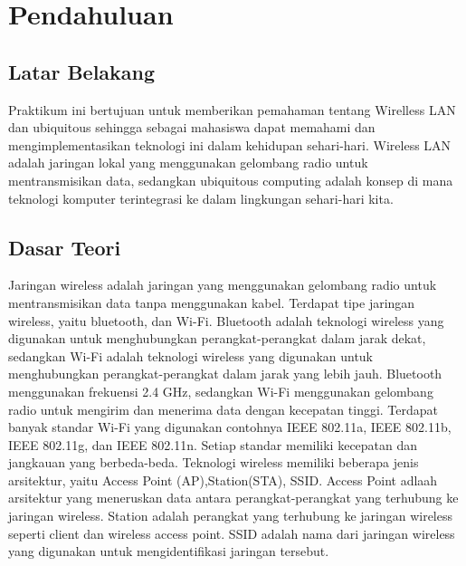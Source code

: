 \section{Pendahuluan}
\subsection{Latar Belakang}
Praktikum ini bertujuan untuk memberikan pemahaman tentang Wirelless LAN dan ubiquitous sehingga sebagai
mahasiswa dapat memahami dan mengimplementasikan teknologi ini dalam kehidupan sehari-hari. Wireless LAN adalah jaringan lokal yang menggunakan gelombang radio untuk mentransmisikan data,
sedangkan ubiquitous computing adalah konsep di mana teknologi komputer terintegrasi ke dalam lingkungan sehari-hari kita.

\subsection{Dasar Teori}
Jaringan wireless adalah jaringan yang menggunakan gelombang radio untuk mentransmisikan data tanpa menggunakan kabel.
Terdapat tipe jaringan wireless, yaitu bluetooth, dan Wi-Fi. Bluetooth adalah teknologi wireless yang digunakan untuk 
menghubungkan perangkat-perangkat dalam jarak dekat, sedangkan Wi-Fi adalah teknologi wireless yang digunakan untuk 
menghubungkan perangkat-perangkat dalam jarak yang lebih jauh. Bluetooth menggunakan frekuensi 2.4 GHz, sedangkan Wi-Fi
menggunakan gelombang radio untuk mengirim dan menerima data dengan kecepatan tinggi. Terdapat banyak standar Wi-Fi yang digunakan
contohnya IEEE 802.11a, IEEE 802.11b, IEEE 802.11g, dan IEEE 802.11n. Setiap standar memiliki kecepatan dan jangkauan yang berbeda-beda.
Teknologi wireless memiliki beberapa jenis arsitektur, yaitu Access Point (AP),Station(STA), SSID. Access Point adlaah 
arsitektur yang meneruskan data antara perangkat-perangkat yang terhubung ke jaringan wireless. 
Station adalah perangkat yang terhubung ke jaringan wireless seperti client dan wireless access point.
SSID adalah nama dari jaringan wireless yang digunakan untuk mengidentifikasi jaringan tersebut.
	
	
	
	
 

